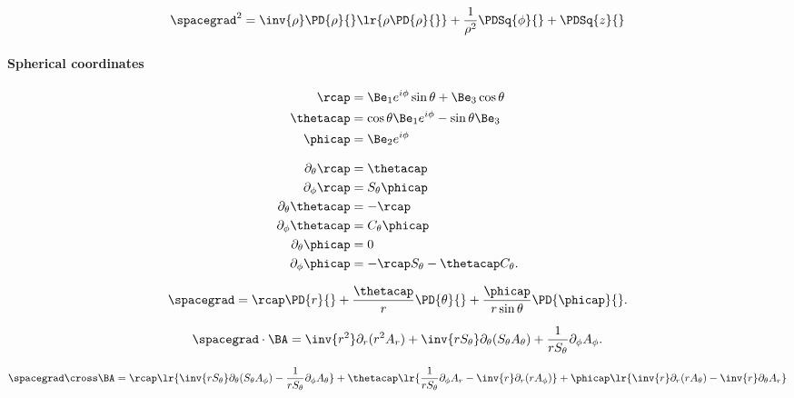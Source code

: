 \begin{dmath}\label{eqn:usefulFormulas:820}
\spacegrad^2 
=
\inv{\rho} \PD{\rho}{} \lr{ \rho \PD{\rho}{} }
+ \frac{1}{\rho^2} \PDSq{\phi}{}
+ \PDSq{z}{}
\end{dmath}

\paragraph{Spherical coordinates}

\begin{dmath}\label{eqn:usefulFormulas:840}
\begin{aligned}
\rcap &= \Be_1 e^{i\phi} \sin\theta + \Be_3 \cos\theta \\
\thetacap &= \cos\theta \Be_1 e^{i\phi} - \sin\theta \Be_3 \\
\phicap &= \Be_2 e^{i\phi}
\end{aligned}
\end{dmath}

\begin{dmath}\label{eqn:usefulFormulas:860}
\begin{aligned}
\partial_{\theta}{\rcap}      &= \thetacap \\
\partial_{\phi}{\rcap}        &= S_\theta \phicap \\
\partial_{\theta}{\thetacap}  &= -\rcap \\
\partial_{\phi}{\thetacap}    &= C_\theta \phicap \\
\partial_{\theta}{\phicap}    &= 0 \\
\partial_{\phi}{\phicap}      &= -\rcap S_\theta - \thetacap C_\theta.
\end{aligned}
\end{dmath}

\begin{dmath}\label{eqn:usefulFormulas:880}
\spacegrad 
=
\rcap \PD{r}{} +
\frac{\thetacap}{r} \PD{\theta}{} +
\frac{\phicap}{r\sin\theta} \PD{\phicap}{}.
\end{dmath}

\begin{dmath}\label{eqn:usefulFormulas:900}
\spacegrad \cdot \BA
=
\inv{r^2} \partial_r (r^2 A_r)
+ \inv{r S_\theta} \partial_\theta (S_\theta A_\theta)
+ \frac{1}{r S_\theta} \partial_\phi A_\phi.
\end{dmath}

\begin{dmath}\label{eqn:usefulFormulas:920}
\spacegrad \cross \BA 
=
   \rcap \lr{ 
       \inv{r S_\theta} \partial_\theta (S_\theta A_\phi)
      -\frac{1}{r S_\theta} \partial_\phi A_\theta
   }
   + \thetacap \lr{ 
      \frac{1}{r S_\theta} \partial_\phi A_r
      -\inv{r} \partial_r (r A_\phi)
   }
   + \phicap \lr{ 
        \inv{r} \partial_r (r A_\theta)
      - \inv{r} \partial_\theta A_r 
   }
\end{dmath}

